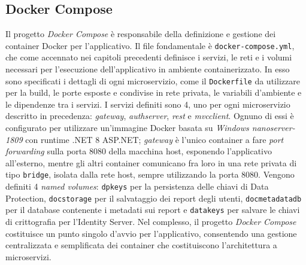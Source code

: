 \subsection{Docker Compose}
Il progetto \emph{Docker Compose} è responsabile della definizione e gestione dei container Docker per l'applicativo.
Il file fondamentale è \texttt{docker-compose.yml}, che come accennato nei capitoli precedenti definisce i servizi, le reti e i volumi necessari per l'esecuzione dell'applicativo in ambiente containerizzato. In esso sono specificati i dettagli di ogni microservizio, come il \texttt{Dockerfile} da utilizzare per la build, le porte esposte e condivise in rete privata, le variabili d'ambiente e le dipendenze tra i servizi.
I servizi definiti sono 4, uno per ogni microservizio descritto in precedenza: \emph{gateway}, \emph{authserver}, \emph{rest} e \emph{mvcclient}.
Ognuno di essi è configurato per utilizzare un'immagine Docker basata su \emph{Windows nanoserver-1809} con runtime .NET 8 ASP.NET; \emph{gateway} è l'unico container a fare \emph{port forwarding} sulla porta 8080 della macchina host, esponendo l'applicativo all'esterno, mentre gli altri container comunicano fra loro in una rete privata di tipo \texttt{bridge}, isolata dalla rete host, sempre utilizzando la porta 8080.
Vengono definiti 4 \emph{named volumes}: \texttt{dpkeys} per la persistenza delle chiavi di Data Protection, \texttt{docstorage} per il salvataggio dei report degli utenti, \texttt{docmetadatadb} per il database contenente i metadati sui report e \texttt{datakeys} per salvare le chiavi di crittografia per l'Identity Server.
Nel complesso, il progetto \emph{Docker Compose} costituisce un punto singolo d'avvio per l'applicativo, consentendo una gestione centralizzata e semplificata dei container che costituiscono l'architettura a microservizi.
